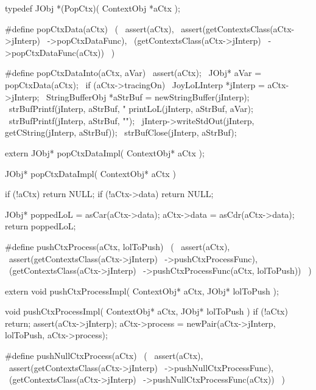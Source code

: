 \startCHeader
typedef JObj *(PopCtx)(
  ContextObj *aCtx
);

#define popCtxData(aCtx)                    \
  (                                         \
    assert(aCtx),                           \
    assert(getContextsClass(aCtx->jInterp)  \
      ->popCtxDataFunc),                    \
    (getContextsClass(aCtx->jInterp)        \
      ->popCtxDataFunc(aCtx))               \
  )

#define popCtxDataInto(aCtx, aVar)                              \
assert(aCtx);                                                   \
JObj* aVar = popCtxData(aCtx);                              \
if (aCtx->tracingOn) {                                          \
  JoyLoLInterp *jInterp = aCtx->jInterp;                        \
  StringBufferObj *aStrBuf = newStringBuffer(jInterp);          \
  strBufPrintf(jInterp, aStrBuf, "%
  printLoL(jInterp, aStrBuf, aVar);                             \
  strBufPrintf(jInterp, aStrBuf, "\n");                         \
  jInterp->writeStdOut(jInterp, getCString(jInterp, aStrBuf));  \
  strBufClose(jInterp, aStrBuf);                                \
}
\stopCHeader

\setCHeaderStream{private}
\startCHeader
extern JObj* popCtxDataImpl(
  ContextObj* aCtx
);
\stopCHeader
\setCHeaderStream{public}

\startCCode
JObj* popCtxDataImpl(
  ContextObj* aCtx
) {
  if (!aCtx) return NULL;
  if (!aCtx->data) return NULL;

  JObj* poppedLoL = asCar(aCtx->data);
  aCtx->data          = asCdr(aCtx->data);
  return poppedLoL;
}
\stopCCode

\startCHeader
#define pushCtxProcess(aCtx, lolToPush)        \
  (                                            \
    assert(aCtx),                              \
    assert(getContextsClass(aCtx->jInterp)     \
      ->pushCtxProcessFunc),                   \
    (getContextsClass(aCtx->jInterp)           \
      ->pushCtxProcessFunc(aCtx, lolToPush))   \
  )
\stopCHeader

\startCHeader
extern void pushCtxProcessImpl(
  ContextObj* aCtx,
  JObj* lolToPush
);
\stopCHeader
\setCHeaderStream{public}

\startCCode
void pushCtxProcessImpl(
  ContextObj* aCtx,
  JObj* lolToPush
) {
  if (!aCtx) return;
  assert(aCtx->jInterp);
  aCtx->process = newPair(aCtx->jInterp, lolToPush, aCtx->process);
}
\stopCCode

\startCHeader
#define pushNullCtxProcess(aCtx)            \
  (                                         \
    assert(aCtx),                           \
    assert(getContextsClass(aCtx->jInterp)  \
      ->pushNullCtxProcessFunc),            \
    (getContextsClass(aCtx->jInterp)        \
      ->pushNullCtxProcessFunc(aCtx))       \
  )
\stopCHeader

